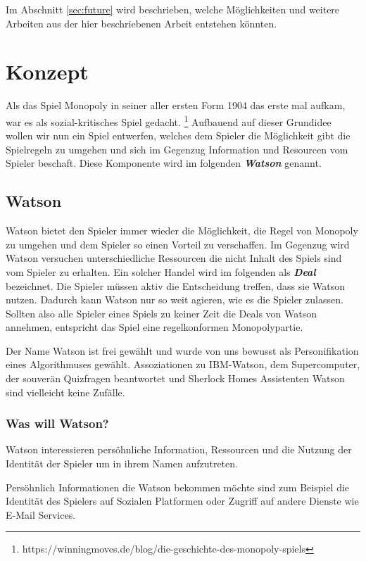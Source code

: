 \documentclass[german]{cgspaper} %
\newcommand{\neuerBegriff}[1]{\textbf{\textit{#1}}}
\begin{document}
    Im Abschnitt \ref{sec:future} wird beschrieben, welche Möglichkeiten und weitere Arbeiten aus der hier beschriebenen Arbeit entstehen könnten.
    

\section{Konzept}\label{sec:concept}

Als das Spiel Monopoly in seiner aller ersten Form 1904 das erste mal aufkam, war es als sozial-kritisches Spiel gedacht. \footnote{https://winningmoves.de/blog/die-geschichte-des-monopoly-spiels}
Aufbauend auf dieser Grundidee wollen wir nun ein Spiel entwerfen, welches dem Spieler die Möglichkeit gibt die Spielregeln zu umgehen und sich im Gegenzug Information und Resourcen vom Spieler beschaft. 
Diese Komponente wird im folgenden \neuerBegriff{Watson} genannt.

\subsection{Watson}

Watson bietet den Spieler immer wieder die Möglichkeit, die Regel von Monopoly zu umgehen und dem Spieler so einen Vorteil zu verschaffen.
Im Gegenzug wird Watson versuchen unterschiedliche Ressourcen die nicht Inhalt des Spiels sind vom Spieler zu erhalten.
Ein solcher Handel wird im folgenden als \neuerBegriff{Deal} bezeichnet.
Die Spieler müssen aktiv die Entscheidung treffen, dass sie Watson nutzen.
Dadurch kann Watson nur so weit agieren, wie es die Spieler zulassen.
Sollten also alle Spieler eines Spiels zu keiner Zeit die Deals von Watson annehmen, entspricht das Spiel eine regelkonformen Monopolypartie.

Der Name Watson ist frei gewählt und wurde von uns bewusst als Personifikation eines Algorithmuses gewählt. Assoziationen zu IBM-Watson, dem Supercomputer, der souverän Quizfragen beantwortet und Sherlock Homes Assistenten Watson sind vielleicht keine Zufälle.

\subsubsection{Was will Watson?}

Watson interessieren persöhnliche Information, Ressourcen und die Nutzung der Identität der Spieler um in ihrem Namen aufzutreten.

Persöhnlich Informationen die Watson bekommen möchte sind zum Beispiel die Identität des Spielers auf Sozialen Platformen oder Zugriff auf andere Dienste wie E-Mail Services.
\end{document}

